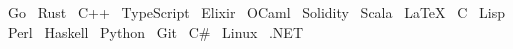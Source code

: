 
\raggedright{
  \textbullet{}~Go
  \textbullet{}~Rust
  \textbullet{}~C++
  \textbullet{}~TypeScript
  \textbullet{}~Elixir
  \textbullet{}~OCaml
  \textbullet{}~Solidity
  \textbullet{}~Scala
  \textbullet{}~\LaTeX
  \textbullet{}~C
  \textbullet{}~Lisp
  \textbullet{}~Perl
  \textbullet{}~Haskell
  \textbullet{}~Python
  \textbullet{}~Git
  \textbullet{}~C\#
  \textbullet{}~Linux
  \textbullet{}~.NET
}